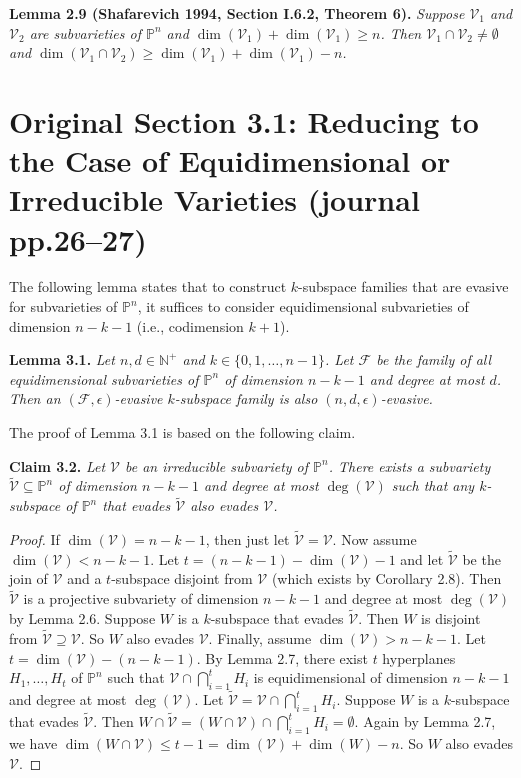 \documentclass[10pt,a4paper]{article}
\newcommand{\PP}{\mathbb P}
\newenvironment{result}[1]{\par\medskip\noindent\textbf{#1.}\itshape}{\par\medskip}
\begin{document}
\begin{result}{Lemma 2.9 (Shafarevich 1994, Section I.6.2, Theorem 6)}
Suppose $\mathcal V_1$ and $\mathcal V_2$ are subvarieties of $\PP^n$ and $\dim(\mathcal V_1)+\dim(\mathcal V_1)\ge n$. Then $\mathcal V_1\cap\mathcal V_2\ne\emptyset$ and $\dim(\mathcal V_1\cap\mathcal V_2)\ge\dim(\mathcal V_1)+\dim(\mathcal V_1)-n$.
\end{result}
\section*{Original Section 3.1: Reducing to the Case of Equidimensional or Irreducible Varieties (journal pp.26--27)}
The following lemma states that to construct $k$-subspace families that are evasive for subvarieties of $\PP^n$, it suffices to consider equidimensional subvarieties of dimension $n-k-1$ (i.e., codimension $k+1$).
\begin{result}{Lemma 3.1}
Let $n,d\in\mathbb N^+$ and $k\in\{0,1,\ldots,n-1\}$. Let $\mathcal F$ be the family of all equidimensional subvarieties of $\PP^n$ of dimension $n-k-1$ and degree at most $d$. Then an $(\mathcal F,\epsilon)$-evasive $k$-subspace family is also $(n,d,\epsilon)$-evasive.
\end{result}
The proof of Lemma 3.1 is based on the following claim.
\begin{result}{Claim 3.2}
Let $\mathcal V$ be an irreducible subvariety of $\PP^n$. There exists a subvariety $\widetilde{\mathcal V}\subseteq\PP^n$ of dimension $n-k-1$ and degree at most $\deg(\mathcal V)$ such that any $k$-subspace of $\PP^n$ that evades $\widetilde{\mathcal V}$ also evades $\mathcal V$.
\end{result}
\begin{proof}
If $\dim(\mathcal V)=n-k-1$, then just let $\widetilde{\mathcal V}=\mathcal V$.
Now assume $\dim(\mathcal V)<n-k-1$. Let $t=(n-k-1)-\dim(\mathcal V)-1$ and let $\widetilde{\mathcal V}$ be the join of $\mathcal V$ and a $t$-subspace disjoint from $\mathcal V$ (which exists by Corollary 2.8). Then $\widetilde{\mathcal V}$ is a projective subvariety of dimension $n-k-1$ and degree at most $\deg(\mathcal V)$ by Lemma 2.6. Suppose $W$ is a $k$-subspace that evades $\widetilde{\mathcal V}$. Then $W$ is disjoint from $\widetilde{\mathcal V}\supseteq\mathcal V$. So $W$ also evades $\mathcal V$.
Finally, assume $\dim(\mathcal V)>n-k-1$. Let $t=\dim(\mathcal V)-(n-k-1)$. By Lemma 2.7, there exist $t$ hyperplanes $H_1,\ldots,H_t$ of $\PP^n$ such that $\mathcal V\cap\bigcap_{i=1}^tH_i$ is equidimensional of dimension $n-k-1$ and degree at most $\deg(\mathcal V)$. Let $\widetilde{\mathcal V}=\mathcal V\cap\bigcap_{i=1}^tH_i$. Suppose $W$ is a $k$-subspace that evades $\widetilde{\mathcal V}$. Then $W\cap\widetilde{\mathcal V}=(W\cap\mathcal V)\cap\bigcap_{i=1}^tH_i=\emptyset$. Again by Lemma 2.7, we have $\dim(W\cap\mathcal V)\le t-1=\dim(\mathcal V)+\dim(W)-n$. So $W$ also evades $\mathcal V$.
\end{proof}
\end{document}
